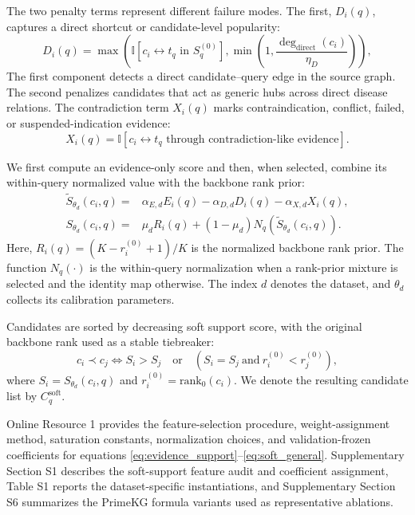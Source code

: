 \documentclass[pdflatex,sn-mathphys-num]{sn-jnl}
\begin{document}
The two penalty terms represent different failure modes. The first, $D_i(q)$, captures a direct shortcut or candidate-level popularity:
\begin{equation}
D_i(q)=
\max\left(
\mathbb{I}[c_i \leftrightarrow t_q \text{ in } S^{(0)}_q],
\min\left(1,\frac{\deg_{\mathrm{direct}}(c_i)}{\eta_D}\right)
\right),
\label{eq:shortcut_penalty}
\end{equation}
The first component detects a direct candidate--query edge in the source graph. The second penalizes candidates that act as generic hubs across direct disease relations. The contradiction term $X_i(q)$ marks contraindication, conflict, failed, or suspended-indication evidence:
\begin{equation}
X_i(q)=\mathbb{I}[c_i \leftrightarrow t_q \text{ through contradiction-like evidence}].
\label{eq:conflict_penalty}
\end{equation}

We first compute an evidence-only score and then, when selected, combine its within-query normalized value with the backbone rank prior:
\begin{equation}
\begin{aligned}
\widetilde{S}_{\theta_d}(c_i,q)=&
\alpha_{E,d}E_i(q)
-\alpha_{D,d}D_i(q)
-\alpha_{X,d}X_i(q),\\
S_{\theta_d}(c_i,q)=&
\mu_d R_i(q)+(1-\mu_d)N_q\!\left(\widetilde{S}_{\theta_d}(c_i,q)\right).
\end{aligned}
\label{eq:soft_general}
\end{equation}
Here, $R_i(q)=(K-r_i^{(0)}+1)/K$ is the normalized backbone rank prior. The function $N_q(\cdot)$ is the within-query normalization when a rank-prior mixture is selected and the identity map otherwise. The index $d$ denotes the dataset, and $\theta_d$ collects its calibration parameters.

Candidates are sorted by decreasing soft support score, with the original backbone rank used as a stable tiebreaker:
\begin{equation}
c_i \prec c_j
\Longleftrightarrow
S_i>S_j
\quad \mathrm{or}\quad
(S_i=S_j \ \mathrm{and}\ r^{(0)}_i<r^{(0)}_j),
\label{eq:tie_break}
\end{equation}
where $S_i=S_{\theta_d}(c_i,q)$ and $r^{(0)}_i=\mathrm{rank}_0(c_i)$. We denote the resulting candidate list by $C^{\mathrm{soft}}_q$.

Online Resource 1 provides the feature-selection procedure, weight-assignment method, saturation constants, normalization choices, and validation-frozen coefficients for equations \eqref{eq:evidence_support}--\eqref{eq:soft_general}. Supplementary Section S1 describes the soft-support feature audit and coefficient assignment, Table S1 reports the dataset-specific instantiations, and Supplementary Section S6 summarizes the PrimeKG formula variants used as representative ablations.
\end{document}
